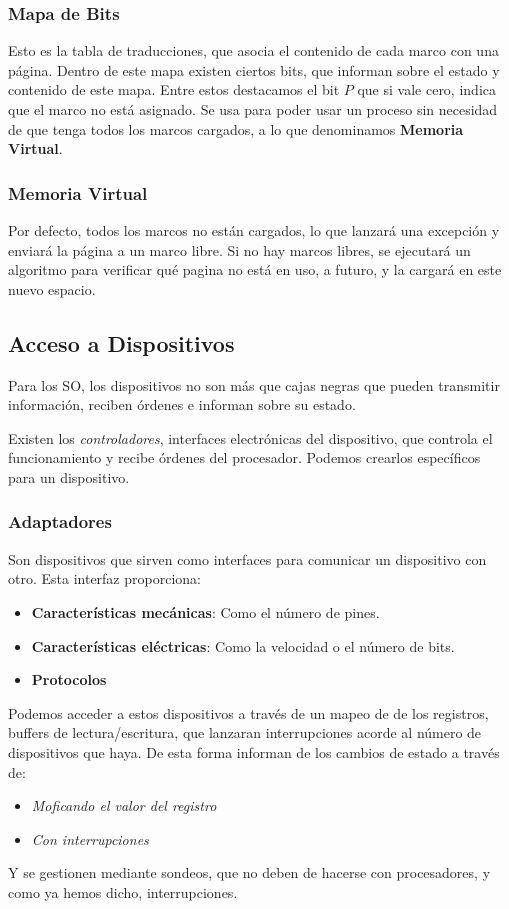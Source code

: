\subsubsection{Mapa de Bits}
Esto es la tabla de traducciones, que asocia el contenido de cada marco con una página. Dentro de este mapa existen ciertos bits, que informan sobre el estado y contenido de este mapa. Entre estos destacamos el bit \(P\) que si vale cero, indica que el marco no está asignado. Se usa para poder usar un proceso sin necesidad de que tenga todos los marcos cargados, a lo que denominamos \textbf{Memoria Virtual}.
\subsubsection{Memoria Virtual}
Por defecto, todos los marcos no están cargados, lo que lanzará una excepción y enviará la página a un marco libre. Si no hay marcos libres, se ejecutará un algoritmo para verificar qué pagina no está en uso, a futuro, y la cargará en este nuevo espacio.
\subsection{Acceso a Dispositivos}
Para los SO, los dispositivos no son más que cajas negras que pueden transmitir información, reciben órdenes e informan sobre su estado.
\par  Existen los \textit{controladores}, interfaces electrónicas del dispositivo, que controla el funcionamiento y recibe órdenes del procesador. Podemos crearlos específicos para un dispositivo.
\subsubsection{Adaptadores}
Son dispositivos que sirven como interfaces para comunicar un dispositivo con otro. Esta interfaz proporciona:
\begin{itemize}
        \item \textbf{Características mecánicas}: Como el número de pines.
        \item \textbf{Características eléctricas}: Como la velocidad o el número de bits.
        \item \textbf{Protocolos}
\end{itemize}
Podemos acceder a estos dispositivos a través de un mapeo de de los registros, buffers de lectura/escritura, que lanzaran interrupciones acorde al número de dispositivos que haya. De esta forma informan de los cambios de estado a través de:
\begin{itemize}
        \item \textit{Moficando el valor del registro}
        \item \textit{Con interrupciones}
\end{itemize}
Y se gestionen mediante sondeos, que no deben de hacerse con procesadores, y como ya hemos dicho, interrupciones.
